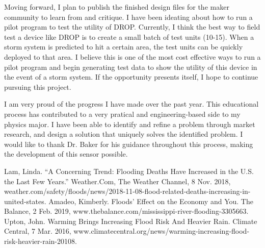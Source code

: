 \documentclass[letter]{article}
\begin{document}
Moving forward, I plan to publish the finished design files for the maker community to learn from and critique. I have been ideating about how to run a pilot program to test the utility of DROP. Currently, I think the best way to field test a device like DROP is to create a small batch of test units (10-15). When a storm system is predicted to hit a certain area, the test units can be quickly deployed to that area. I believe this is one of the most cost effective ways to run a pilot program and begin generating test data to show the utility of this device in the event of a storm system. If the opportunity presents itself, I hope to continue pursuing this project.  

I am very proud of the progress I have made over the past year. This educational process has contributed to a very pratical and engineering-based side to my physics major. I have been able to identify and refine a problem through market research, and design a solution that uniquely solves the identified problem. I would like to thank Dr. Baker for his guidance throughout this process, making the development of this sensor possible. 

\pagebreak
\begin{thebibliography}{9}
	Lam, Linda. “A Concerning Trend: Flooding Deaths Have Increased in the U.S. the Last Few Years.” Weather.Com, The Weather Channel, 8 Nov. 2018, weather.com/safety/floods/news/2018-11-08-flood-related-deaths-increasing-in-united-states.
	Amadeo, Kimberly. Floods' Effect on the Economy and You. The Balance, 2 Feb. 2019, www.thebalance.com/mississippi-river-flooding-3305663.
	Upton, John. Warming Brings Increasing Flood Risk And Heavier Rain. Climate Central, 7 Mar. 2016, www.climatecentral.org/news/warming-increasing-flood-risk-heavier-rain-20108.

\end{thebibliography}
\end{document}
